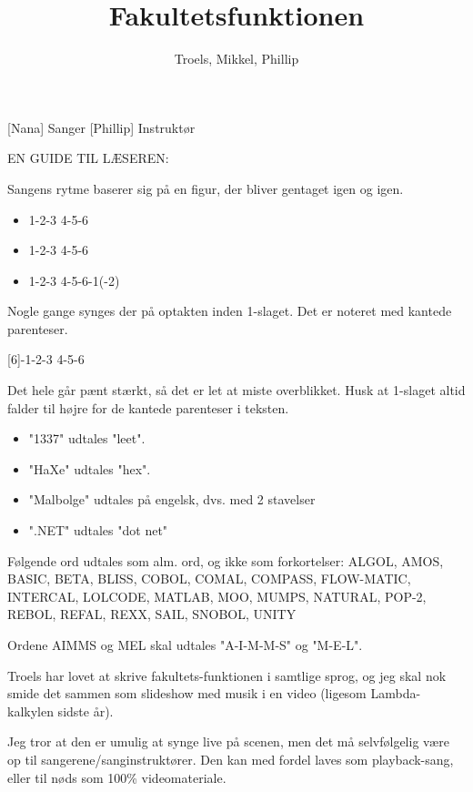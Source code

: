 \documentclass[a4paper,11pt]{article}
\title{Fakultetsfunktionen}
\author{Troels, Mikkel, Phillip}
\begin{document}
\maketitle

\begin{roles}
  [Nana] Sanger
  [Phillip] Instruktør
\end{roles}

EN GUIDE TIL LÆSEREN:

Sangens rytme baserer sig på en figur, der bliver gentaget igen og igen.

\begin{itemize}
\item 1-2-3  4-5-6
\item 1-2-3  4-5-6
\item 1-2-3  4-5-6-1(-2)
\end{itemize}

Nogle gange synges der på optakten inden 1-slaget. Det er noteret med
kantede parenteser.

[6]-1-2-3  4-5-6

Det hele går pænt stærkt, så det er let at miste overblikket. Husk at
1-slaget altid falder til højre for de kantede parenteser i teksten.

\begin{itemize}
\item "1337" udtales "leet".
\item "HaXe" udtales "hex".
\item "Malbolge" udtales på engelsk, dvs. med 2 stavelser
\item ".NET" udtales "dot net"
\end{itemize}

Følgende ord udtales som alm. ord, og ikke som forkortelser:
ALGOL, AMOS, BASIC, BETA, BLISS, COBOL, COMAL, COMPASS, FLOW-MATIC,
INTERCAL, LOLCODE, MATLAB, MOO, MUMPS, NATURAL, POP-2, REBOL, REFAL, REXX,
SAIL, SNOBOL, UNITY

Ordene AIMMS og MEL skal udtales "A-I-M-M-S" og "M-E-L".


Troels har lovet at skrive fakultets-funktionen i samtlige sprog, og jeg
skal nok smide det sammen som slideshow med musik i en video (ligesom
Lambda-kalkylen sidste år).

Jeg tror at den er umulig at synge live på scenen, men det må selvfølgelig
være op til sangerene/sanginstruktører. Den kan med fordel laves som
playback-sang, eller til nøds som 100\% videomateriale.
\end{document}
